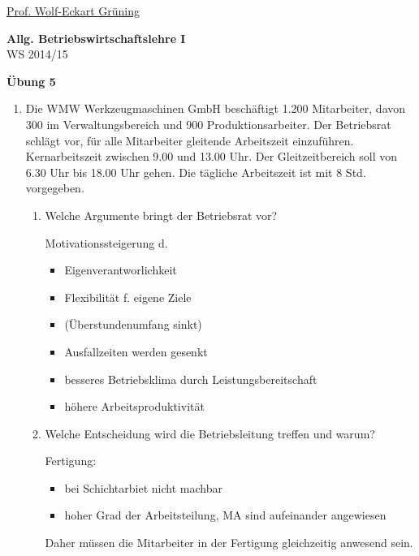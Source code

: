 \documentclass[12pt,a4paper]{scrreprt}
\begin{document}
 
\begin{flushleft}
\href{mailto:gruening@informatik.htw-dresden.de}{Prof. Wolf-Eckart Grüning}
\end{flushleft}

\begin{center}
\large{\textbf{ Allg. Betriebswirtschaftslehre I}} \\
WS 2014/15 \end{center}

\begin{center}\large{\textbf{ Übung 5 }} \end{center}

\bigskip

\begin{enumerate}

\item
Die WMW Werkzeugmaschinen GmbH beschäftigt 1.200 Mitarbeiter, davon 300 im Verwaltungsbereich und 900 Produktionsarbeiter. Der Betriebsrat schlägt vor, für alle Mitarbeiter gleitende Arbeitszeit einzuführen. Kernarbeitszeit zwischen 9.00 und 13.00 Uhr. Der Gleitzeitbereich soll von 6.30 Uhr bis 18.00 Uhr gehen. Die tägliche Arbeitszeit ist mit 8 Std. vorgegeben.

\begin{enumerate}

\item Welche Argumente bringt der Betriebsrat vor?

Motivationssteigerung d.
\begin{itemize}
\item Eigenverantworlichkeit
\item Flexibilität f. eigene Ziele
\item (Überstundenumfang sinkt)
\item Ausfallzeiten werden gesenkt
\item besseres Betriebsklima durch Leistungsbereitschaft
\item höhere Arbeitsproduktivität
\end{itemize}

\item Welche Entscheidung wird die Betriebsleitung treffen und warum?

Fertigung: 
\begin{itemize}
\item bei Schichtarbiet nicht machbar
\item hoher Grad der Arbeitsteilung, MA sind aufeinander angewiesen
\end{itemize}
Daher müssen die Mitarbeiter in der Fertigung gleichzeitig anwesend sein.


\end{enumerate}
\end{enumerate}
\end{document}
